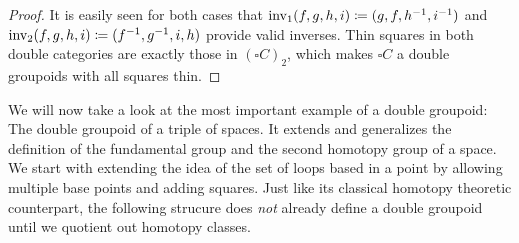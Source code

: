 \begin{proof}
It is easily seen for both cases that $\operatorname{inv_1}(f, g, h, i) \coloneqq (g, f, h^{-1}, i^{-1})$
and $\operatorname{inv_2}(f, g, h, i) \coloneqq (f^{-1}, g^{-1}, i, h)$ provide valid inverses.
Thin squares in both double categories are exactly those in $(\square C)_2$,
which makes $\square C$ a double groupoids with all squares thin. %
\end{proof}

We will now take a look at the most important example of a double groupoid: The
double groupoid of a triple of spaces. 
It extends and generalizes the definition of the fundamental group and the second
homotopy group of a space.
We start with extending the idea of the set of loops based in a point by allowing
multiple base points and adding squares.
Just like its classical homotopy theoretic counterpart,
the following strucure does \emph{not} already define a double groupoid until we
quotient out homotopy classes.

